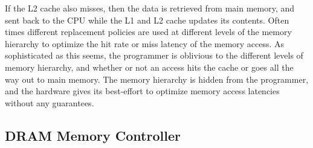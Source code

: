 If the L2 cache also misses, then the data is retrieved from main memory, and sent back to the CPU while the L1 and L2 cache updates its contents.
Often times different replacement policies are used at different levels of the memory hierarchy to optimize the hit rate or miss latency of the memory access. 
As sophisticated as this seems, the programmer is oblivious to the different levels of memory hierarchy, and whether or not an access hits the cache or goes all the way out to main memory. 
The memory hierarchy is hidden from the programmer, and the hardware gives its best-effort to optimize memory access latencies without any guarantees.



\subsection{DRAM Memory Controller}


